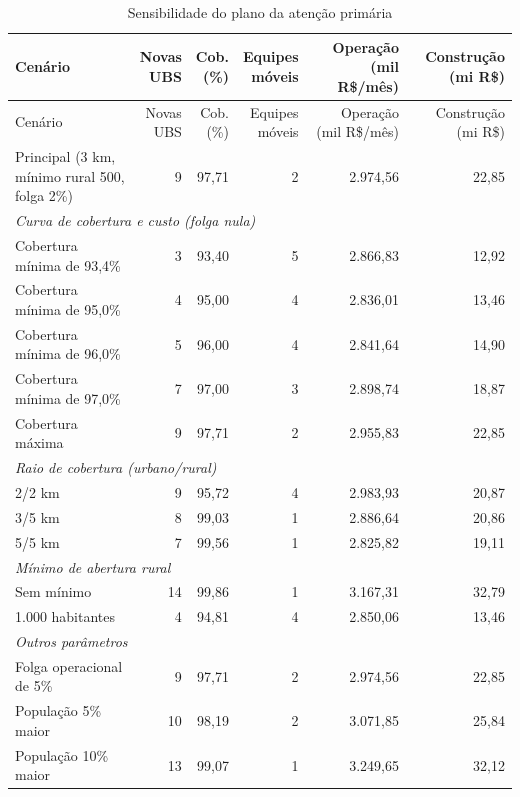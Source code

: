 \begingroup\small\begin{longtable}{p{.36\linewidth}rrrrr}
\caption{Sensibilidade do plano da atenção primária}\label{tab:sensibilidade}\\
\toprule Cenário & \shortstack{Novas\\UBS} & \shortstack{Cob.\\(\%)} & \shortstack{Equipes\\móveis} & \shortstack{Operação\\(mil R\$/mês)} & \shortstack{Construção\\(mi R\$)}\\\midrule\endfirsthead
\toprule Cenário & \shortstack{Novas\\UBS} & \shortstack{Cob.\\(\%)} & \shortstack{Equipes\\móveis} & \shortstack{Operação\\(mil R\$/mês)} & \shortstack{Construção\\(mi R\$)}\\\midrule\endhead
Principal (3 km, mínimo rural 500, folga 2\%) & 9 & 97,71 & 2 & 2.974,56 & 22,85\\
\midrule
\multicolumn{6}{l}{\textit{Curva de cobertura e custo (folga nula)}}\\
Cobertura mínima de 93,4\% & 3 & 93,40 & 5 & 2.866,83 & 12,92\\
Cobertura mínima de 95,0\% & 4 & 95,00 & 4 & 2.836,01 & 13,46\\
Cobertura mínima de 96,0\% & 5 & 96,00 & 4 & 2.841,64 & 14,90\\
Cobertura mínima de 97,0\% & 7 & 97,00 & 3 & 2.898,74 & 18,87\\
Cobertura máxima & 9 & 97,71 & 2 & 2.955,83 & 22,85\\
\midrule
\multicolumn{6}{l}{\textit{Raio de cobertura (urbano/rural)}}\\
2/2 km & 9 & 95,72 & 4 & 2.983,93 & 20,87\\
3/5 km & 8 & 99,03 & 1 & 2.886,64 & 20,86\\
5/5 km & 7 & 99,56 & 1 & 2.825,82 & 19,11\\
\midrule
\multicolumn{6}{l}{\textit{Mínimo de abertura rural}}\\
Sem mínimo & 14 & 99,86 & 1 & 3.167,31 & 32,79\\
1.000 habitantes & 4 & 94,81 & 4 & 2.850,06 & 13,46\\
\midrule
\multicolumn{6}{l}{\textit{Outros parâmetros}}\\
Folga operacional de 5\% & 9 & 97,71 & 2 & 2.974,56 & 22,85\\
População 5\% maior & 10 & 98,19 & 2 & 3.071,85 & 25,84\\
População 10\% maior & 13 & 99,07 & 1 & 3.249,65 & 32,12\\
\bottomrule\end{longtable}\endgroup
{}

